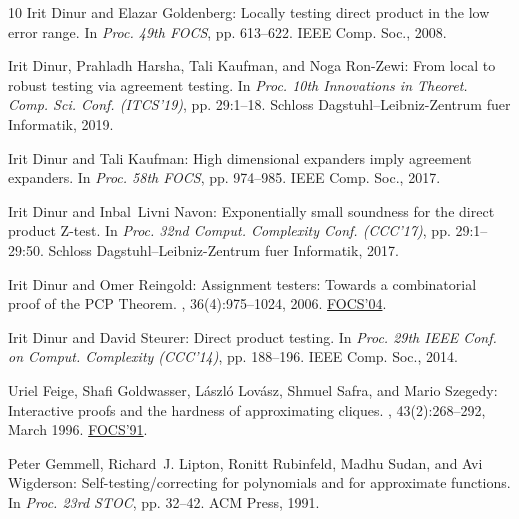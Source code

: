 \documentclass[11pt]{article}
\numberwithin{equation}{section}
\theoremstyle{definition}
\theoremstyle{plain}
\theoremstyle{plain}
\begin{document}
\begin{thebibliography}{10}
{\sc Irit Dinur and Elazar Goldenberg}: Locally testing direct product in the
  low error range.
\newblock In {\em Proc. 49th FOCS}, pp. 613--622. IEEE Comp. Soc., 2008.

{\sc Irit Dinur, Prahladh Harsha, Tali Kaufman, and Noga Ron-Zewi}: From local
  to robust testing via agreement testing.
\newblock In {\em Proc. 10th Innovations in Theoret. Comp. Sci. Conf.
  (ITCS'19)}, pp. 29:1--18. Schloss Dagstuhl--Leibniz-Zentrum fuer Informatik,
  2019.

{\sc Irit Dinur and Tali Kaufman}: High dimensional expanders imply agreement
  expanders.
\newblock In {\em Proc. 58th FOCS}, pp. 974--985. IEEE Comp. Soc., 2017.

{\sc Irit Dinur and Inbal~Livni Navon}: Exponentially small soundness for the
  direct product {Z}-test.
\newblock In {\em Proc. 32nd Comput. Complexity Conf. (CCC'17)}, pp.
  29:1--29:50. Schloss Dagstuhl--Leibniz-Zentrum fuer Informatik, 2017.

{\sc Irit Dinur and Omer Reingold}: Assignment testers: {T}owards a
  combinatorial proof of the {PCP} {T}heorem.
, 36(4):975--1024, 2006.
\newblock \prelim \href{https://doi.org/10.1109/FOCS.2004.16}{FOCS'04}.
\newblock [\epfmtdoi{10.1137/S0097539705446962}]

{\sc Irit Dinur and David Steurer}: Direct product testing.
\newblock In {\em Proc. 29th IEEE Conf. on Comput. Complexity (CCC'14)}, pp.
  188--196. IEEE Comp. Soc., 2014.

{\sc Uriel Feige, Shafi Goldwasser, L{\'a}szl{\'o} Lov{\'a}sz, Shmuel Safra,
  and Mario Szegedy}: Interactive proofs and the hardness of approximating
  cliques.
, 43(2):268--292, March 1996.
\newblock \prelim \href{https://doi.org/10.1109/SFCS.1991.185341}{FOCS'91}.
\newblock [\epfmtdoi{10.1145/226643.226652}]

{\sc Peter Gemmell, Richard~J. Lipton, Ronitt Rubinfeld, Madhu Sudan, and Avi
  Wigderson}: Self-testing/correcting for polynomials and for approximate
  functions.
\newblock In {\em Proc. 23rd STOC}, pp. 32--42. ACM Press, 1991.
\newblock [\epfmtdoi{10.1145/103418.103429}]


\end{thebibliography}
\end{document}
